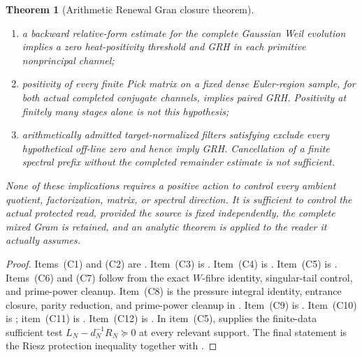 \documentclass[11pt]{article}
\newtheorem{theorem}{Theorem}[section]
\theoremstyle{definition}
\theoremstyle{remark}
\begin{document}
\begin{theorem}[Arithmetic Renewal Gran closure theorem]
\begin{enumerate}[label=\textup{(C\arabic*)},leftmargin=3.2em]
      balanced modulus has already been removed absolutely;
\item a backward relative-form estimate for the complete Gaussian Weil
      evolution implies a zero heat-positivity threshold and GRH in each
      primitive nonprincipal channel;
\item positivity of every finite Pick matrix on a fixed dense Euler-region
      sample, for both actual completed conjugate channels, implies paired
      GRH.  Positivity at finitely many stages alone is not this hypothesis;
\item arithmetically admitted target-normalized filters satisfying
       exclude every hypothetical
      off-line zero and hence imply GRH.  Cancellation of a finite spectral
      prefix without the completed remainder estimate is not sufficient.
\end{enumerate}
None of these implications requires a positive action to control every
ambient quotient, factorization, matrix, or spectral direction.  It is
sufficient to control the actual protected read, provided the source is fixed
independently, the complete mixed Gram is retained, and an analytic theorem is
applied to the reader it actually assumes.
\end{theorem}

\begin{proof}
Items~\textup{(C1)} and \textup{(C2)} are
.  Item~\textup{(C3)} is
.  Item~\textup{(C4)}
is .  Item~\textup{(C5)} is
.  Items~\textup{(C6)} and
\textup{(C7)} follow from the exact $W$-fibre identity, singular-tail control,
and prime-power cleanup.  Item~\textup{(C8)} is the pressure integral
identity, entrance closure, parity reduction, and prime-power cleanup in
.  Item~\textup{(C9)} is
.
Item~\textup{(C10)} is ; item~\textup{(C11)}
is .  Item~\textup{(C12)}
is .
In item~\textup{(C5)},
 supplies the finite-data sufficient test
$L_N-d_N^{-1}R_N\succeq0$ at every relevant support.
The final statement
is the Riesz protection inequality together with
.
\end{proof}
\end{document}
